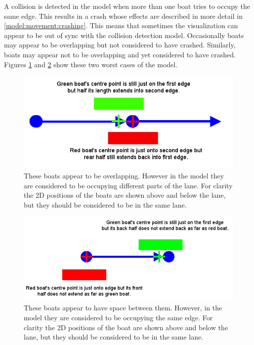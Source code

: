       A collision is detected in the model when more than one boat tries to occupy the same edge. This results in a crash whose effects are described in more detail in \ref{model:movement:crashing}. This means that sometimes the visualization can appear to be out of sync with the collision detection model. Occasionally boats may appear to be overlapping but not considered to have crashed. Similarly, boats may appear not to be overlapping and yet considered to have crashed. Figures \ref{fig:model:worstcase_overlapping} and \ref{fig:model:worstcase_no_overlap} show these two worst cases of the model.
      
      \begin{figure}
      \begin{center}
      	\includegraphics[scale=0.6]{images/overlap_worst_case.png}
      	\caption{These boats appear to be overlapping. However in the model they are considered to be occupying different parts of the lane. For clarity the 2D positions of the boats are shown above and below the lane, but they should be considered to be in the same lane.}
      	\label{fig:model:worstcase_overlapping}
      \end{center}
      \end{figure}
      
      \begin{figure}
      \begin{center}
      	\includegraphics[scale=0.6]{images/worstcase_no_overlap.png}
      	\caption{These boats appear to have space between them. However, in the model they are considered to be occupying the same edge. For clarity the 2D positions of the boat are shown above and below the lane, but they should be considered to be in the same lane.}
      	\label{fig:model:worstcase_no_overlap}
      \end{center}
      \end{figure}
      

